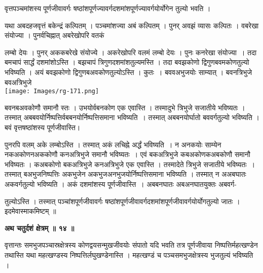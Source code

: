 \documentclass[11pt, openany]{book}
\begin{document}
{\ab वृत्तपञ्चमांशस्य पूर्णजीवावर्गः षष्ठांशपूर्णज्यावर्गदशमांशपूर्णज्यावर्गयोर्योगेन तुल्यो भवति । }\\
\vspace{3mm}

यथा अबदहजवृत्तं बकेन्द्रं कल्पितम् । पञ्चमांशज्या अबं कल्पितम् । पुनर् अवझं व्यासः कल्पितः । वबरेखा संयोज्या । पुनर्वचिह्नात् अबरेखोपरि वतकं 
\begin{vwcol}[widths={0.7,0.3}, sep=.8cm, rule=0pt]
 लम्बो देयः । पुनर् अककबरेखे संयोज्ये । अकरेखोपरि वलमं लम्बो देयः । पुनः कनरेखा संयोज्या~। तदा बमचापं सार्द्धं दशमांशोऽस्ति । बझचापं त्रिगुणदशमांशतुल्यमस्ति । तदा बवझकोणो द्विगुणबवमकोणतुल्यो भविष्यति । अयं बवझकोणो द्विगुणबअवकोणतुल्योऽस्ति । कुतः~। बववअभुजयोः साम्यात् । बवनत्रिभुजे बवअत्रिभुजे\\
 
\noindent \texttt{[image: Images/rg-171.png]}  
\end{vwcol}
\vspace{-3mm}
\noindent बवनबअवकोणौ समानौ स्तः । उभयोर्वबनकोण एक एवास्ति । तस्मादुभे त्रिभुजे सजातीये भविष्यतः । तस्मात् अबबवयोर्निष्पत्तिर्वबबनयोर्निष्पत्तिसमाना भविष्यति~। तस्मात् अबबनयोर्घातो बववर्गतुल्यो भविष्यति । बवं वृत्तषष्ठांशस्य पूर्णजीवास्ति।\\
\vspace{5mm}

पुनरपि वलम् अके लम्बोऽस्ति । तस्मात् अकं लचिह्ने अर्द्धं भविष्यति~। न अनकयोः साम्येन नकअकोणनअककोणौ कनअत्रिभुजे समानौ भविष्यतः~। एवं बकअत्रिभुजे कबअकोणकअबकोणौ समानौ भविष्यतः । कअबकोणो बकअत्रिभुजे कनअत्रिभुजे एक एवास्ति । तस्मादेते त्रिभुजे सजातीये भविष्यतः~। तस्मात् बअभुजनिष्पत्तिः अकभुजेन अकभुजअनभुजयोर्निष्पत्तिसमाना
भविष्यति । तस्मात् न अअबघातः अकवर्गतुल्यो भविष्यति । अकं दशमांशस्य पूर्णजीवास्ति~। अबबनघातः अबअनघातयुक्तः अबवर्ग-

\newpage

\noindent तुल्योऽस्ति । तस्मात् पञ्चांशपूर्णजीवावर्गः षष्ठांशपूर्णजीवावर्गदशमांशपूर्णजीवावर्गयोर्योगतुल्यो जातः । इदमेवास्माकमिष्टम् ॥\\
\vspace{3mm}

\begin{center}
\textbf{\large अथ चतुर्दशं क्षेत्रम् ॥ १४ ॥ }
\end{center}
\vspace{5mm}

{\ab वृत्तान्तः समभुजपञ्चास्रक्षेत्रस्य कोणद्वयसन्मुखजीवयोः  संपातो यदि भवति तत्र पूर्णजीवाया निष्पत्तिर्महत्खण्डेन तथास्ति यथा महत्खण्डस्य निष्पत्तिर्लघुखण्डेनास्ति । महत्खण्डं च पञ्चसमभुजक्षेत्रस्य भुजतुल्यं भविष्यति । }\\
\vspace{5mm}
\end{document}

